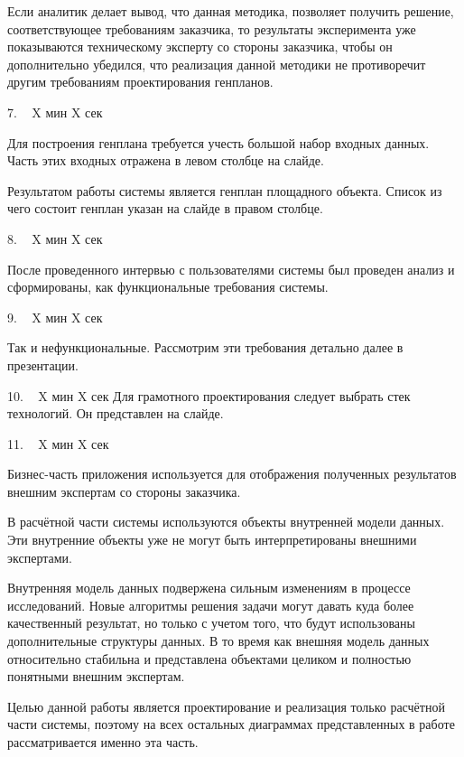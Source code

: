 \documentclass[a4paper,14pt]{extarticle}
\begin{document}
    Если аналитик делает вывод, что данная методика, позволяет получить решение, соответствующее требованиям
    заказчика, то результаты эксперимента уже показываются техническому эксперту со стороны заказчика,
    чтобы он дополнительно убедился, что реализация данной методики не противоречит другим требованиям
    проектирования генпланов.

    7. ~ X мин X сек

    Для построения генплана требуется учесть большой набор входных данных.
    Часть этих входных отражена в левом столбце на слайде.

    Результатом работы системы является генплан площадного объекта.
    Список из чего состоит генплан указан на слайде в правом столбце.

    8. ~ X мин X сек

    После проведенного интервью с пользователями системы был проведен анализ и сформированы,
    как функциональные требования системы.

    9. ~ X мин X сек

    Так и нефункциональные.
    Рассмотрим эти требования детально далее в презентации.

    10. ~ X мин X сек
    Для грамотного проектирования следует выбрать стек технологий. Он представлен на слайде.

    11. ~ X мин X сек

    Бизнес-часть приложения используется для отображения полученных результатов внешним экспертам со стороны заказчика.

    В расчётной части системы используются объекты внутренней модели данных.
    Эти внутренние объекты уже не могут быть интерпретированы внешними экспертами.

    Внутренняя модель данных подвержена сильным изменениям в процессе исследований.
    Новые алгоритмы решения задачи могут давать куда более качественный результат, но только с учетом того, что
    будут использованы дополнительные структуры данных. В то время как внешняя модель данных относительно стабильна
    и представлена объектами целиком и полностью понятными внешним экспертам.

    Целью данной работы является проектирование и реализация только расчётной части системы, поэтому на всех остальных
    диаграммах представленных в работе рассматривается именно эта часть.
\end{document}
